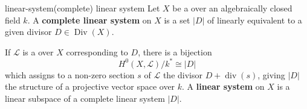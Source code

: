\begin{topic}{linear-system}{(complete) linear system}
    Let $X$ be a    over an algebraically closed field $k$. A \textbf{complete linear system} on $X$ is a set $|D|$ of  linearly equivalent to a given divisor $D \in \operatorname{Div}(X)$.
    
    If $\mathcal{L}$ is a  over $X$ corresponding to $D$, there is a bijection
    \[ H^0(X, \mathcal{L}) / k^* \cong |D| \]
    which assigns to a non-zero section $s$ of $\mathcal{L}$ the divisor $D + \operatorname{div}(s)$, giving $|D|$ the structure of a projective vector space over $k$. A \textbf{linear system} on $X$ is a linear subspace of a complete linear system $|D|$.
\end{topic}
